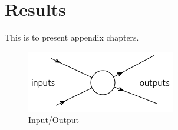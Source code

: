 \chapter{Results}

This is to present appendix chapters.

\begin{figure}
    \includegraphics[width=0.9\linewidth]{figures/inout}
    \caption[Input/Output]{Input/Output}
\end{figure}
